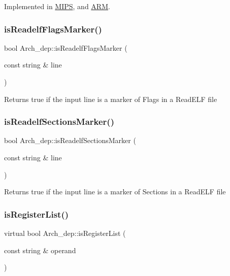 Implemented in \hyperlink{classMIPS_ae38afe5659e9efe2ff909fa5c4acc047}{M\+I\+PS}, and \hyperlink{classARM_a765b29f0b8e3226723000d2f8d68ec8e}{A\+RM}.

\mbox{\label{classArch__dep_ac38abb4817048b6cb4c996042f478318}} 
\subsubsection{\texorpdfstring{is\+Readelf\+Flags\+Marker()}{isReadelfFlagsMarker()}}
{\footnotesize\ttfamily bool Arch\+\_\+dep\+::is\+Readelf\+Flags\+Marker (\begin{DoxyParamCaption}\item[{const string \&}]{line }\end{DoxyParamCaption})}

Returns true if the input line is a marker of Flags in a Read\+E\+LF file \mbox{\label{classArch__dep_af20f87a328dec6fd2c1fe8d8106c00cb}} 
\subsubsection{\texorpdfstring{is\+Readelf\+Sections\+Marker()}{isReadelfSectionsMarker()}}
{\footnotesize\ttfamily bool Arch\+\_\+dep\+::is\+Readelf\+Sections\+Marker (\begin{DoxyParamCaption}\item[{const string \&}]{line }\end{DoxyParamCaption})}

Returns true if the input line is a marker of Sections in a Read\+E\+LF file \mbox{\label{classArch__dep_a6c37096e67b2c02e9c0bd38313245979}} 
\subsubsection{\texorpdfstring{is\+Register\+List()}{isRegisterList()}}
{\footnotesize\ttfamily virtual bool Arch\+\_\+dep\+::is\+Register\+List (\begin{DoxyParamCaption}\item[{const string \&}]{operand }\end{DoxyParamCaption})\hspace{0.3cm}{\ttfamily [pure virtual]}}

